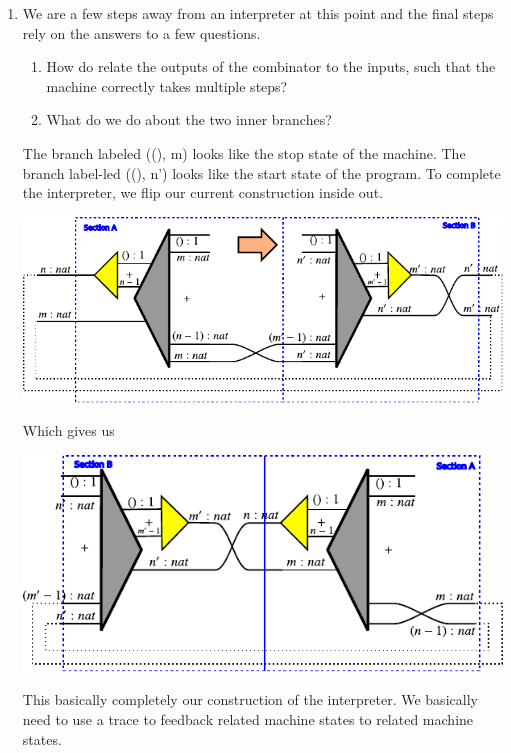 \documentclass{llncs}
\begin{document}
\begin{enumerate}
\item
We are a few steps away from an interpreter at this point and the
final steps rely on the answers to a few questions.

\begin{enumerate}
\item How do relate the outputs of the combinator to the inputs, such
  that the machine correctly takes multiple steps?

\item What do we do about the two inner branches? 

\end{enumerate}

The branch labeled {{((), m)}} looks like the stop state of the
machine. The branch label-led {{((), n')}} looks like the start state
of the program. To complete the interpreter, we flip our current
construction inside out.

\begin{center}
  \includegraphics{diagrams/nat-nat6.pdf}
\end{center}

Which gives us

\begin{center}
  \includegraphics{diagrams/nat-nat7.pdf}
\end{center}

This basically completely our construction of the interpreter. We
basically need to use a {{trace}} to feedback related machine states
to related machine states.


\end{enumerate}
\end{document}
